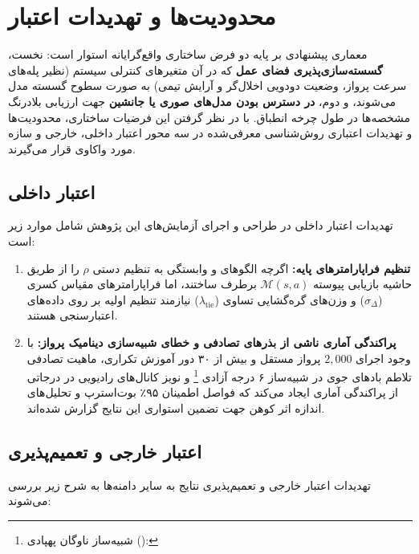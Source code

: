 \documentclass[oneside,openany,phd]{TMU-Thesis}
\begin{document}
\section{محدودیت‌ها و تهدیدات اعتبار}

معماری پیشنهادی بر پایه دو فرض ساختاری واقع‌گرایانه استوار است: نخست، \textbf{گسسته‌سازی‌پذیری فضای عمل} که در آن متغیرهای کنترلی سیستم (نظیر پله‌های سرعت پرواز، وضعیت دودویی اخلال‌گر و آرایش تیمی) به صورت سطوح گسسته مدل می‌شوند، و دوم، \textbf{در دسترس بودن مدل‌های صوری یا جانشین} جهت ارزیابی بلادرنگ مشخصه‌ها در طول چرخه انطباق. با در نظر گرفتن این فرضیات ساختاری، محدودیت‌ها و تهدیدات اعتباری روش‌شناسی معرفی‌شده در سه محور اعتبار داخلی، خارجی و سازه مورد واکاوی قرار می‌گیرند.

\subsection{اعتبار داخلی}

تهدیدات اعتبار داخلی در طراحی و اجرای آزمایش‌های این پژوهش شامل موارد زیر است:

\begin{enumerate}
  \item \textbf{تنظیم فراپارامترهای پایه:} اگرچه الگوهای \sgos و \caepv وابستگی به تنظیم دستی $\rho$ را از طریق حاشیه بازیابی پیوسته $\mathcal{M}(s, a)$ برطرف ساختند، اما فراپارامترهای مقیاس کسری ($\sigma_\Delta$) و وزن‌های گره‌گشایی تساوی ($\lambda_{\text{tie}}$) نیازمند تنظیم اولیه بر روی داده‌های اعتبارسنجی هستند.
  \item \textbf{پراکندگی آماری ناشی از بذرهای تصادفی و خطای شبیه‌سازی دینامیک پرواز:} با وجود اجرای $2{,}000$ پرواز مستقل و بیش از ۳۰ دور آموزش تکراری، ماهیت تصادفی تلاطم بادهای جوی در شبیه‌ساز ۶ درجه آزادی \footnote{شبیه‌ساز ناوگان پهپادی  (): } و نویز کانال‌های رادیویی در  درجاتی از پراکندگی آماری ایجاد می‌کند که فواصل اطمینان ۹۵٪ بوت‌استرپ و تحلیل‌های اندازه اثر کوهن جهت تضمین استواری این نتایج گزارش شده‌اند.
\end{enumerate}

\subsection{اعتبار خارجی و تعمیم‌پذیری}

تهدیدات اعتبار خارجی و تعمیم‌پذیری نتایج به سایر دامنه‌ها به شرح زیر بررسی می‌شوند:
\end{document}
